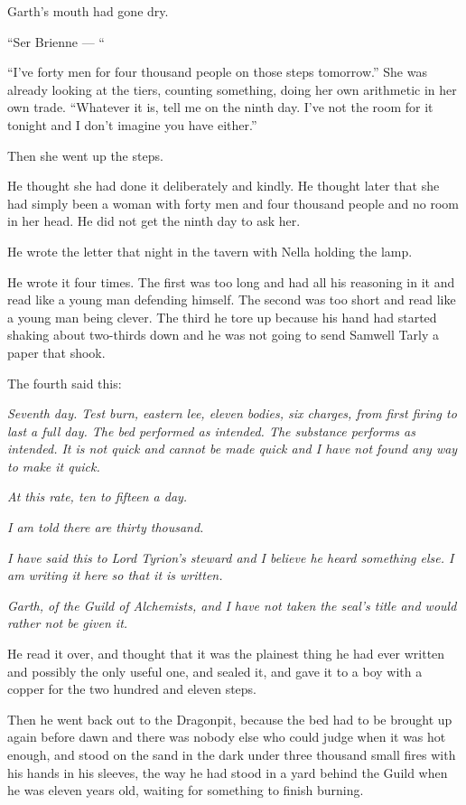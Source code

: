 Garth’s mouth had gone dry.

“Ser Brienne — “

“I’ve forty men for four thousand people on those steps tomorrow.” She was already looking at the tiers, counting something, doing her own arithmetic in her own trade. “Whatever it is, tell me on the ninth day. I’ve not the room for it tonight and I don’t imagine you have either.”

Then she went up the steps.

He thought she had done it deliberately and kindly. He thought later that she had simply been a woman with forty men and four thousand people and no room in her head. He did not get the ninth day to ask her.

\sceneBreak

He wrote the letter that night in the tavern with Nella holding the lamp.

He wrote it four times. The first was too long and had all his reasoning in it and read like a young man defending himself. The second was too short and read like a young man being clever. The third he tore up because his hand had started shaking about two-thirds down and he was not going to send Samwell Tarly a paper that shook.

The fourth said this:

\textit{Seventh day. Test burn, eastern lee, eleven bodies, six charges, from first firing to last a full day. The bed performed as intended. The substance performs as intended. It is not quick and cannot be made quick and I have not found any way to make it quick.}

\textit{At this rate, ten to fifteen a day.}

\textit{I am told there are thirty thousand.}

\textit{I have said this to Lord Tyrion’s steward and I believe he heard something else. I am writing it here so that it is written.}

\textit{Garth, of the Guild of Alchemists, and I have not taken the seal’s title and would rather not be given it.}

He read it over, and thought that it was the plainest thing he had ever written and possibly the only useful one, and sealed it, and gave it to a boy with a copper for the two hundred and eleven steps.

Then he went back out to the Dragonpit, because the bed had to be brought up again before dawn and there was nobody else who could judge when it was hot enough, and stood on the sand in the dark under three thousand small fires with his hands in his sleeves, the way he had stood in a yard behind the Guild when he was eleven years old, waiting for something to finish burning.